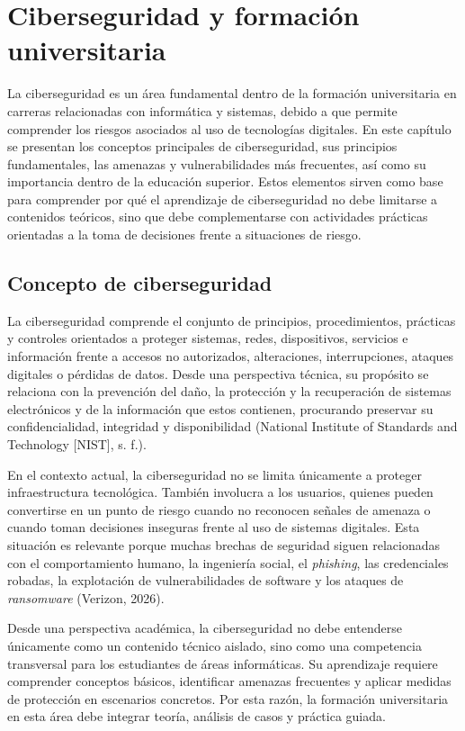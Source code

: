 \section{Ciberseguridad y formación universitaria}

La ciberseguridad es un área fundamental dentro de la formación universitaria en carreras relacionadas con informática y sistemas, debido a que permite comprender los riesgos asociados al uso de tecnologías digitales. En este capítulo se presentan los conceptos principales de ciberseguridad, sus principios fundamentales, las amenazas y vulnerabilidades más frecuentes, así como su importancia dentro de la educación superior. Estos elementos sirven como base para comprender por qué el aprendizaje de ciberseguridad no debe limitarse a contenidos teóricos, sino que debe complementarse con actividades prácticas orientadas a la toma de decisiones frente a situaciones de riesgo.

\subsection{Concepto de ciberseguridad}

La ciberseguridad comprende el conjunto de principios, procedimientos, prácticas y controles orientados a proteger sistemas, redes, dispositivos, servicios e información frente a accesos no autorizados, alteraciones, interrupciones, ataques digitales o pérdidas de datos. Desde una perspectiva técnica, su propósito se relaciona con la prevención del daño, la protección y la recuperación de sistemas electrónicos y de la información que estos contienen, procurando preservar su confidencialidad, integridad y disponibilidad (National Institute of Standards and Technology [NIST], s. f.).

En el contexto actual, la ciberseguridad no se limita únicamente a proteger infraestructura tecnológica. También involucra a los usuarios, quienes pueden convertirse en un punto de riesgo cuando no reconocen señales de amenaza o cuando toman decisiones inseguras frente al uso de sistemas digitales. Esta situación es relevante porque muchas brechas de seguridad siguen relacionadas con el comportamiento humano, la ingeniería social, el \textit{phishing}, las credenciales robadas, la explotación de vulnerabilidades de software y los ataques de \textit{ransomware} (Verizon, 2026).

Desde una perspectiva académica, la ciberseguridad no debe entenderse únicamente como un contenido técnico aislado, sino como una competencia transversal para los estudiantes de áreas informáticas. Su aprendizaje requiere comprender conceptos básicos, identificar amenazas frecuentes y aplicar medidas de protección en escenarios concretos. Por esta razón, la formación universitaria en esta área debe integrar teoría, análisis de casos y práctica guiada.

